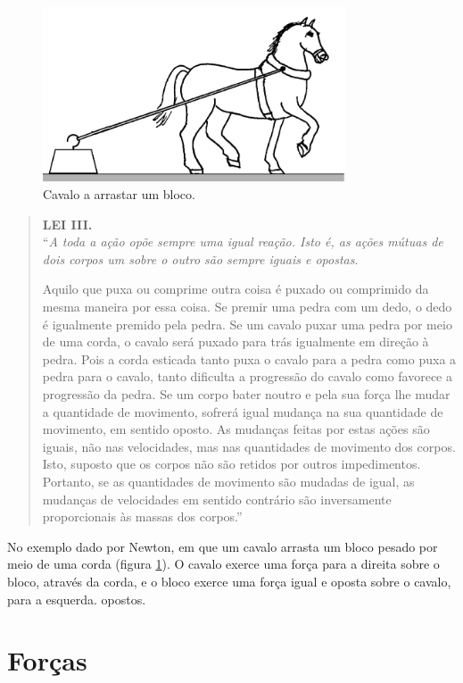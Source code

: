 \documentclass[a4paper,12pt,twosided]{report}
\begin{document}
\begin{figure}[!b]
\centering
\includegraphics[width=0.8\textwidth]{cavalo.pdf}
\caption{Cavalo a arrastar um bloco.}
\label{fig:cavalo}
\end{figure}

\begin{quotation}
\noindent\textbf{LEI III.}\\
``\emph{A toda a ação opõe sempre uma igual
reação.  Isto é, as ações mútuas de dois
corpos um sobre o outro são sempre iguais e opostas}.

Aquilo que puxa ou comprime outra coisa é puxado ou comprimido da mesma
maneira por essa coisa. Se premir uma pedra com um dedo, o dedo é
igualmente premido pela pedra. Se um cavalo puxar uma pedra por meio de uma
corda, o cavalo será puxado para trás igualmente em direção à pedra.
Pois a corda esticada tanto puxa o cavalo para a pedra como puxa a pedra
para o cavalo, tanto dificulta a progressão do cavalo como favorece a
progressão da pedra. Se um corpo bater noutro e pela sua força lhe mudar
a quantidade de movimento, sofrerá igual mudança na sua quantidade de
movimento, em sentido oposto. As mudanças feitas por estas ações são
iguais, não nas velocidades, mas nas quantidades de movimento dos corpos.
Isto, suposto que os corpos não são retidos por outros impedimentos.
Portanto, se as quantidades de movimento são mudadas de igual, as
mudanças de velocidades em sentido contrário são inversamente
proporcionais às massas dos corpos.''
\end{quotation}

No exemplo dado por Newton, em que um cavalo arrasta um bloco pesado
por meio de uma corda (figura \ref{fig:cavalo}). O cavalo exerce uma
força para a direita sobre o bloco, através da corda, e o bloco exerce
uma força igual e oposta sobre o cavalo, para a esquerda.  opostos.

\chapter{Forças}
\end{document}
